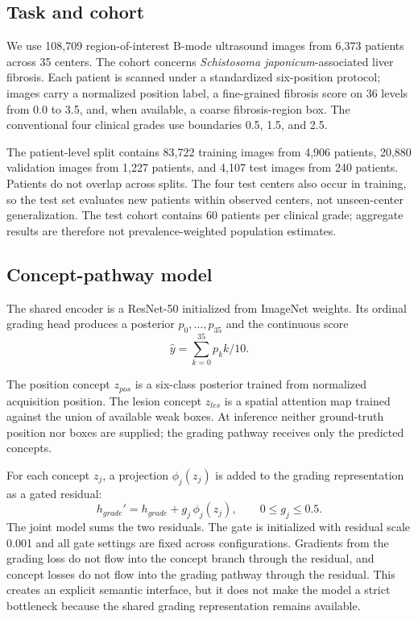 \subsection{Task and cohort}
We use 108,709 region-of-interest B-mode ultrasound images from 6,373 patients across 35 centers. The cohort concerns \emph{Schistosoma japonicum}-associated liver fibrosis. Each patient is scanned under a standardized six-position protocol; images carry a normalized position label, a fine-grained fibrosis score on 36 levels from 0.0 to 3.5, and, when available, a coarse fibrosis-region box. The conventional four clinical grades use boundaries 0.5, 1.5, and 2.5.

The patient-level split contains 83,722 training images from 4,906 patients, 20,880 validation images from 1,227 patients, and 4,107 test images from 240 patients. Patients do not overlap across splits. The four test centers also occur in training, so the test set evaluates new patients within observed centers, not unseen-center generalization. The test cohort contains 60 patients per clinical grade; aggregate results are therefore not prevalence-weighted population estimates.

\subsection{Concept-pathway model}
The shared encoder is a ResNet-50 initialized from ImageNet weights. Its ordinal grading head produces a posterior $p_0,\ldots,p_{35}$ and the continuous score
\begin{equation}
\hat y=\sum_{k=0}^{35}p_k k/10.
\end{equation}

The position concept $z_{pos}$ is a six-class posterior trained from normalized acquisition position. The lesion concept $z_{les}$ is a spatial attention map trained against the union of available weak boxes. At inference neither ground-truth position nor boxes are supplied; the grading pathway receives only the predicted concepts.

For each concept $z_j$, a projection $\phi_j(z_j)$ is added to the grading representation as a gated residual:
\begin{equation}
h_{grade}'=h_{grade}+g_j\,\phi_j(z_j), \qquad 0\leq g_j\leq0.5.
\end{equation}
The joint model sums the two residuals. The gate is initialized with residual scale 0.001 and all gate settings are fixed across configurations. Gradients from the grading loss do not flow into the concept branch through the residual, and concept losses do not flow into the grading pathway through the residual. This creates an explicit semantic interface, but it does not make the model a strict bottleneck because the shared grading representation remains available.

